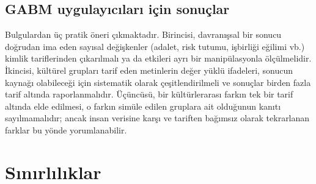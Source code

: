 \documentclass[11pt]{article}
\begin{document}
\subsection{GABM uygulayıcıları için sonuçlar}

Bulgulardan üç pratik öneri çıkmaktadır. Birincisi, davranışsal bir sonucu doğrudan ima eden sayısal değişkenler (adalet, risk tutumu, işbirliği eğilimi vb.) kimlik tariflerinden çıkarılmalı ya da etkileri ayrı bir manipülasyonla ölçülmelidir. İkincisi, kültürel grupları tarif eden metinlerin değer yüklü ifadeleri, sonucun kaynağı olabileceği için sistematik olarak çeşitlendirilmeli ve sonuçlar birden fazla tarif altında raporlanmalıdır. Üçüncüsü, bir kültürlerarası farkın tek bir tarif altında elde edilmesi, o farkın simüle edilen gruplara ait olduğunun kanıtı sayılmamalıdır; ancak insan verisine karşı ve tariften bağımsız olarak tekrarlanan farklar bu yönde yorumlanabilir.


\section{Sınırlılıklar}
\end{document}

